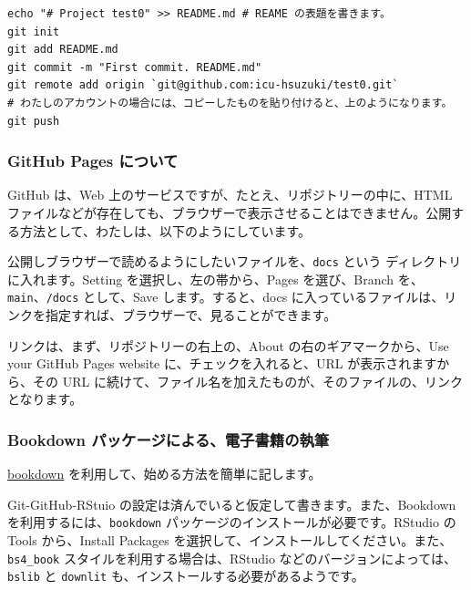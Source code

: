 \documentclass[
]{bxjsbook}
\theoremstyle{definition}
\theoremstyle{definition}
\theoremstyle{definition}
\theoremstyle{definition}
\theoremstyle{remark}
\begin{document}
\begin{verbatim}
echo "# Project test0" >> README.md # REAME の表題を書きます。
git init
git add README.md
git commit -m "First commit. README.md"
git remote add origin `git@github.com:icu-hsuzuki/test0.git`
# わたしのアカウントの場合には、コピーしたものを貼り付けると、上のようになります。
git push
\end{verbatim}

\hypertarget{github-pages-ux306bux3064ux3044ux3066}{%
\subsubsection{GitHub Pages について}\label{github-pages-ux306bux3064ux3044ux3066}}

GitHub は、Web 上のサービスですが、たとえ、リポジトリーの中に、HTML ファイルなどが存在しても、ブラウザーで表示させることはできません。公開する方法として、わたしは、以下のようにしています。

公開しブラウザーで読めるようにしたいファイルを、\texttt{docs} という ディレクトリに入れます。Setting を選択し、左の帯から、Pages を選び、Branch を、\texttt{main}、\texttt{/docs} として、Save します。すると、docs に入っているファイルは、リンクを指定すれば、ブラウザーで、見ることができます。

リンクは、まず、リポジトリーの右上の、About の右のギアマークから、Use your GitHub Pages website に、チェックを入れると、URL が表示されますから、その URL に続けて、ファイル名を加えたものが、そのファイルの、リンクとなります。

\hypertarget{bookdown-ux30d1ux30c3ux30b1ux30fcux30b8ux306bux3088ux308bux96fbux5b50ux66f8ux7c4dux306eux57f7ux7b46}{%
\subsubsection{Bookdown パッケージによる、電子書籍の執筆}\label{bookdown-ux30d1ux30c3ux30b1ux30fcux30b8ux306bux3088ux308bux96fbux5b50ux66f8ux7c4dux306eux57f7ux7b46}}

\href{https://github.com/rstudio/bookdown}{bookdown} を利用して、始める方法を簡単に記します。

Git-GitHub-RStuio の設定は済んでいると仮定して書きます。また、Bookdown を利用するには、\texttt{bookdown} パッケージのインストールが必要です。RStudio の Tools から、Install Packages を選択して、インストールしてください。また、\texttt{bs4\_book} スタイルを利用する場合は、RStudio などのバージョンによっては、\texttt{bslib} と \texttt{downlit} も、インストールする必要があるようです。
\end{document}
